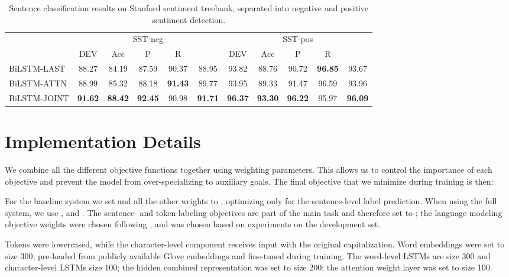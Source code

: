 \documentclass[letterpaper]{article} \usepackage{aaai19}  \usepackage{times}  \usepackage{helvet}  \usepackage{courier}  \usepackage{graphicx}
\renewcommand\cite{\citep}	\newcommand\newcite{\citet}
\begin{document}
\begin{table*}[t]
\centering
\setlength\tabcolsep{9pt}
\begin{tabular}{l|ccccc|ccccc} \toprule
 & \multicolumn{5}{c|}{{\small SST-neg}} & \multicolumn{5}{c}{{\small SST-pos}} \\
 & {\small DEV } & {\small Acc} & {\small P} & {\small R} & {\small } & {\small DEV } & {\small Acc} & {\small P} & {\small R} & {\small } \\ \midrule
{\small BiLSTM-LAST} & 88.27 & 84.19 & 87.59 & 90.37 & 88.95 & 93.82 & 88.76 & 90.72 & \textbf{96.85} & 93.67 \\ 
{\small BiLSTM-ATTN} & 88.99 & 85.32 & 88.18 & \textbf{91.43} & 89.77 & 93.95 & 89.33 & 91.47 & 96.59 & 93.96 \\
{\small BiLSTM-JOINT} & \textbf{91.62} & \textbf{88.42} & \textbf{92.45} & 90.98 & \textbf{91.71} & \textbf{96.37} & \textbf{93.30} & \textbf{96.22} & 95.97 & \textbf{96.09} \\ \bottomrule
\end{tabular}
\caption{Sentence classification results on Stanford sentiment treebank, separated into negative and positive sentiment detection.}
\label{tab:results2}
\end{table*}








\section{Implementation Details}



We combine all the different objective functions together using weighting parameters. 
This allows us to control the importance of each objective and prevent the model from over-specializing to auxiliary goals.
The final objective that we minimize during training is then:


For the baseline system we set  and all the other weights to , optimizing only for the sentence-level label prediction.
When using the full system, we use ,  and . The sentence- and token-labeling objectives are part of the main task and therefore set to ; the language modeling objective weights were chosen following \citet{Rei2017}, and  was chosen based on experiments on the development set.

Tokens were lowercased, while the character-level component receives input with the original capitalization.
Word embeddings were set to size 300, pre-loaded from publicly available Glove embeddings \cite{Pennington} and fine-tuned during training.
The word-level LSTMs are size 300 and character-level LSTMs size 100; the hidden combined representation  was set to size 200; the attention weight layer  was set to size 100.
\end{document}
